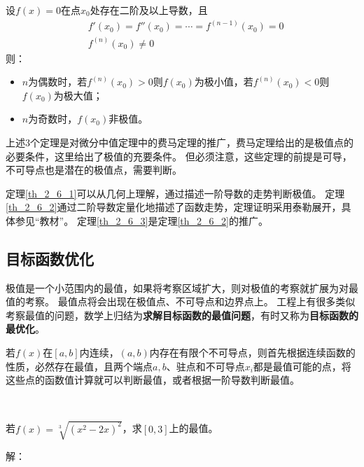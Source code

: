 \begin{theorem} \label{th_2_6_3}
设$f\left( x \right) =0$在点$x_0$处存在二阶及以上导数，且
\begin{align*}
&f'\left( x_0 \right) =f''\left( x_0 \right) =\cdots =f^{\left( n-1 \right)}\left( x_0 \right) =0 \\
&f^{\left( n \right)}\left( x_0 \right) \ne 0
\end{align*}
则：
\begin{itemize}
    \item $n$为偶数时，若$f^{\left( n \right)}\left( x_0 \right) >0$则$f\left( x_0 \right) $为极小值，若$f^{\left( n \right)}\left( x_0 \right) <0$则$f\left( x_0 \right) $为极大值；
    \item $n$为奇数时，$f\left( x_0 \right) $非极值。
\end{itemize}
\end{theorem}

上述3个定理是对微分中值定理中的费马定理的推广，费马定理给出的是极值点的必要条件，这里给出了极值的充要条件。
但必须注意，这些定理的前提是可导，不可导点也是潜在的极值点，需要判断。

定理\ref{th_2_6_1}可以从几何上理解，通过描述一阶导数的走势判断极值。
定理\ref{th_2_6_2}通过二阶导数定量化地描述了函数走势，定理证明采用泰勒展开，具体参见“教材\cite{book1}”。
定理\ref{th_2_6_3}是定理\ref{th_2_6_2}的推广。

\subsection{目标函数优化}

极值是一个小范围内的最值，如果将考察区域扩大，则对极值的考察就扩展为对最值的考察。
最值点将会出现在极值点、不可导点和边界点上。
工程上有很多类似考察最值的问题，数学上归结为{\bf 求解目标函数的最值问题}，有时又称为{\bf 目标函数的最优化}。

若$f\left( x \right) $在$\left[ a,b \right] $内连续，$\left( a,b \right) $内存在有限个不可导点，则首先根据连续函数的性质，必然存在最值，且两个端点$a,b$、驻点和不可导点$x_i$都是最值可能的点，将这些点的函数值计算就可以判断最值，或者根据一阶导数判断最值。

~

\begin{example}
若$f\left( x \right) =\sqrt[3]{\left( x^2-2x \right) ^2}$，求$\left[ 0,3 \right] $上的最值。
\end{example}

解：

